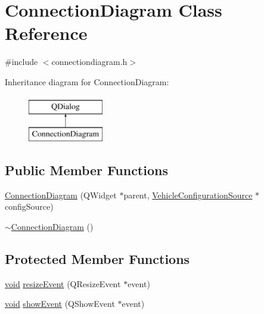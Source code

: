 \hypertarget{class_connection_diagram}{\section{Connection\-Diagram Class Reference}
\label{class_connection_diagram}
}


{\ttfamily \#include $<$connectiondiagram.\-h$>$}

Inheritance diagram for Connection\-Diagram\-:\begin{figure}[H]
\begin{center}
\leavevmode
\includegraphics[height=2.000000cm]{class_connection_diagram}
\end{center}
\end{figure}
\subsection*{Public Member Functions}
\begin{DoxyCompactItemize}
\item 
\hyperlink{group___connection_diagram_gac4980bbc0b4895238c2f6184739b88b9}{Connection\-Diagram} (Q\-Widget $\ast$parent, \hyperlink{class_vehicle_configuration_source}{Vehicle\-Configuration\-Source} $\ast$config\-Source)
\item 
\hyperlink{group___connection_diagram_gab640bd026ce6a3692e7f4cd1d7d0f907}{$\sim$\-Connection\-Diagram} ()
\end{DoxyCompactItemize}
\subsection*{Protected Member Functions}
\begin{DoxyCompactItemize}
\item 
\hyperlink{group___u_a_v_objects_plugin_ga444cf2ff3f0ecbe028adce838d373f5c}{void} \hyperlink{group___connection_diagram_ga286bacde8e23a0b374d72fb979203bb8}{resize\-Event} (Q\-Resize\-Event $\ast$event)
\item 
\hyperlink{group___u_a_v_objects_plugin_ga444cf2ff3f0ecbe028adce838d373f5c}{void} \hyperlink{group___connection_diagram_ga53179afe974da356b81da1fea3ee75b8}{show\-Event} (Q\-Show\-Event $\ast$event)
\end{DoxyCompactItemize}


